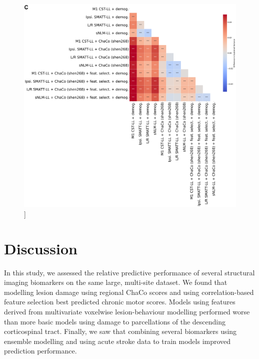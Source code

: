 \documentclass[phd,tocprelim]{cornell}
\renewcommand{\caption}[1]{\singlespacing\hangcaption{#1}\normalspacing}
\begin{document}
\null
\vfill
\clearpage
\null
\vfill
\begin{figure}[h!]
		\ContinuedFloat
		\captionsetup{labelformat=adja-page}
    \centering
    \includegraphics[width=1\textwidth]{chapter3/Figure3C.png}
    \caption[]{}
\end{figure}
\null
\vfill
\clearpage


\section{Discussion}
In this study, we assessed the relative predictive performance of several structural imaging biomarkers on the same large, multi-site dataset. We found that modelling lesion damage using regional ChaCo scores and using correlation-based feature selection best predicted chronic motor scores. Models using features derived from multivariate voxelwise lesion-behaviour modelling performed worse than more basic models using damage to parcellations of the descending corticospinal tract. Finally, we saw that combining several biomarkers using ensemble modelling and using acute stroke data to train models improved prediction performance.
\end{document}
